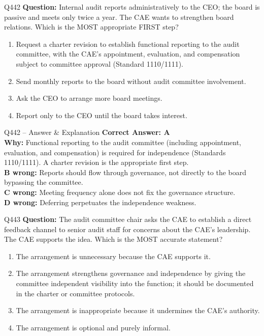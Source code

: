 \documentclass[aspectratio=169,10pt]{beamer}
\begin{document}
	\begin{frame}[t]{Q442}
		\small
		\textbf{Question:} Internal audit reports administratively to the CEO; the board is passive and meets only twice a year. The CAE wants to strengthen board relations. Which is the MOST appropriate FIRST step?
		\begin{enumerate}[label=\Alph*.,itemsep=1pt,topsep=2pt]
			\item Request a charter revision to establish functional reporting to the audit committee, with the CAE's appointment, evaluation, and compensation subject to committee approval (Standard 1110/1111).
			\item Send monthly reports to the board without audit committee involvement.
			\item Ask the CEO to arrange more board meetings.
			\item Report only to the CEO until the board takes interest.
		\end{enumerate}
	\end{frame}
	
	\begin{frame}[t]{Q442 -- Answer \& Explanation}
		\small
		\textbf{Correct Answer: A} \\[4pt]
		\textbf{Why:} Functional reporting to the audit committee (including appointment, evaluation, and compensation) is required for independence (Standards 1110/1111). A charter revision is the appropriate first step. \\[4pt]
		\textbf{B wrong:} Reports should flow through governance, not directly to the board bypassing the committee. \\[2pt]
		\textbf{C wrong:} Meeting frequency alone does not fix the governance structure. \\[2pt]
		\textbf{D wrong:} Deferring perpetuates the independence weakness.
	\end{frame}
	
	\begin{frame}[t]{Q443}
		\small
		\textbf{Question:} The audit committee chair asks the CAE to establish a direct feedback channel to senior audit staff for concerns about the CAE's leadership. The CAE supports the idea. Which is the MOST accurate statement?
		\begin{enumerate}[label=\Alph*.,itemsep=1pt,topsep=2pt]
			\item The arrangement is unnecessary because the CAE supports it.
			\item The arrangement strengthens governance and independence by giving the committee independent visibility into the function; it should be documented in the charter or committee protocols.
			\item The arrangement is inappropriate because it undermines the CAE's authority.
			\item The arrangement is optional and purely informal.
		\end{enumerate}
	\end{frame}
	
\end{document}

